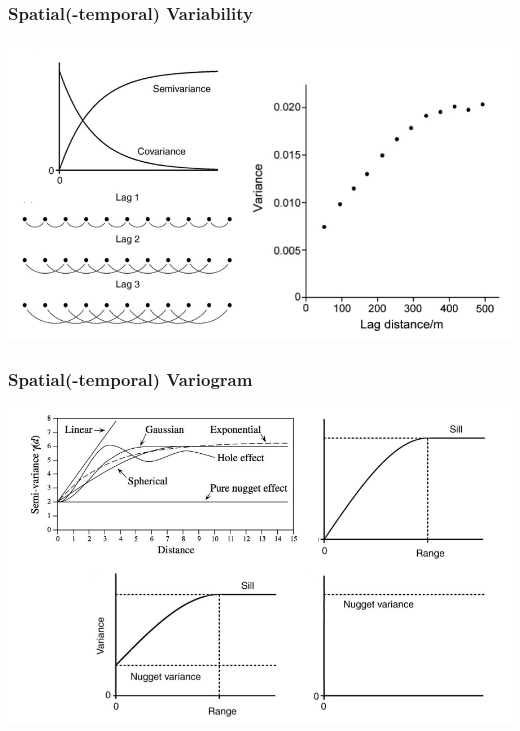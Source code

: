 \documentclass{beamer}
\begin{document}
\begin{frame}
\frametitle{Spatial(-temporal) Variability}
\centering
\includegraphics[width=\textwidth]{Figures/vario1.png}
\end{frame}


\begin{frame}
\frametitle{Spatial(-temporal) Variogram}
\centering
\includegraphics[width=\textwidth]{Figures/variogram.png}
\end{frame}

\end{document}
